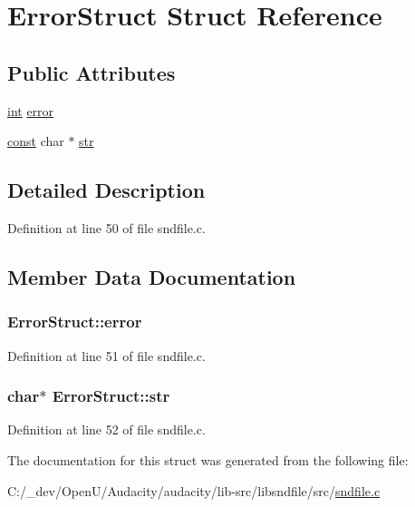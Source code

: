 \hypertarget{struct_error_struct}{}\section{Error\+Struct Struct Reference}
\label{struct_error_struct}
\subsection*{Public Attributes}
\begin{DoxyCompactItemize}
\item 
\hyperlink{xmltok_8h_a5a0d4a5641ce434f1d23533f2b2e6653}{int} \hyperlink{struct_error_struct_a6f1fe35b41a3ef9c9c005e8ba1407b90}{error}
\item 
\hyperlink{getopt1_8c_a2c212835823e3c54a8ab6d95c652660e}{const} char $\ast$ \hyperlink{struct_error_struct_a53f51eb7eae139107535f2dabb405861}{str}
\end{DoxyCompactItemize}


\subsection{Detailed Description}


Definition at line 50 of file sndfile.\+c.



\subsection{Member Data Documentation}
\subsubsection[{\texorpdfstring{error}{error}}]{ Error\+Struct\+::error}\hypertarget{struct_error_struct_a6f1fe35b41a3ef9c9c005e8ba1407b90}{}\label{struct_error_struct_a6f1fe35b41a3ef9c9c005e8ba1407b90}


Definition at line 51 of file sndfile.\+c.

\subsubsection[{\texorpdfstring{str}{str}}]{ char$\ast$ Error\+Struct\+::str}\hypertarget{struct_error_struct_a53f51eb7eae139107535f2dabb405861}{}\label{struct_error_struct_a53f51eb7eae139107535f2dabb405861}


Definition at line 52 of file sndfile.\+c.



The documentation for this struct was generated from the following file\+:\begin{DoxyCompactItemize}
\item 
C\+:/\+\_\+dev/\+Open\+U/\+Audacity/audacity/lib-\/src/libsndfile/src/\hyperlink{sndfile_8c}{sndfile.\+c}\end{DoxyCompactItemize}
